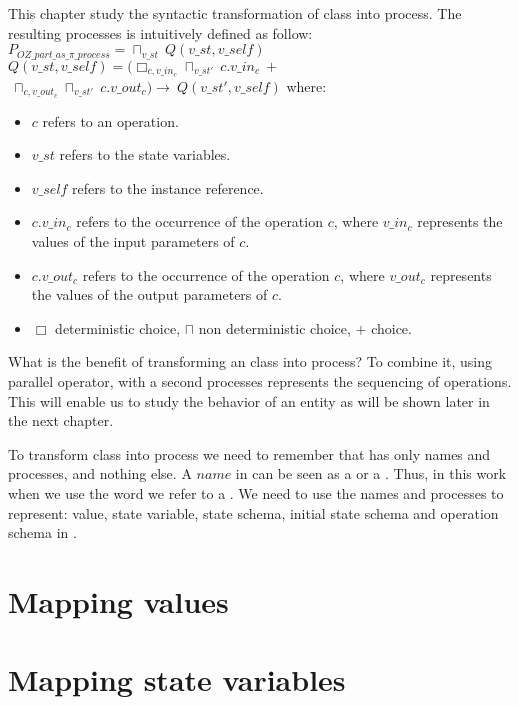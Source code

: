 This chapter study the syntactic transformation of \oz{} class into \picalc{} process. The resulting processes is intuitively defined as follow:\\
$P_{OZ\_part\_as\_\pi\_process} = \sqcap _{v\_st}\ Q(v\_st,v\_self)$\\
$Q(v\_st,v\_self) = (\Box _{c,v\_in_{c}} \sqcap _{v\_st'} \ c.v\_in_{c} \ +$ \\ $ \ \sqcap _{c,v\_out_{c}} \sqcap _{v\_st'} \ c.v\_out_{c})\rightarrow \ Q(v\_st',v\_self)$
where:
\begin{itemize}
\item $c$ refers to an operation.
\item $v\_st$ refers to the state variables.
\item $v\_self$ refers to the instance reference.
\item $c.v\_in_{c}$ refers to the occurrence of the operation $c$, where $v\_in_{c}$ represents the values of the input parameters of $c$.
\item $c.v\_out_{c}$ refers to the occurrence of the operation $c$, where $v\_out_{c}$ represents the values of the output parameters of $c$.
\item $\Box$ deterministic choice, $\sqcap$ non deterministic choice, $+$ choice.
\end{itemize}
What is the benefit of transforming an \oz{} class into \picalc{} process? To combine it, using parallel operator, with a second \picalc{} processes represents the sequencing of operations. This will enable us to study the behavior of an entity as will be shown later in the next chapter.

To transform \oz{} class into \picalc{} process we need to remember that  \picalc{} has only names and processes, and nothing else. A $name$ in \picalc{} can be seen as a  or a . Thus, in this work when we use the word  we refer to a \picalc{} . We need to use the names and processes to represent: value, state variable, state schema, initial state schema and operation schema in \picalc{}.
\section{Mapping values}
\label{sec_tra_mapping_values}


\section{Mapping state variables}
\label{sec_tra_mapping_state_variables}


